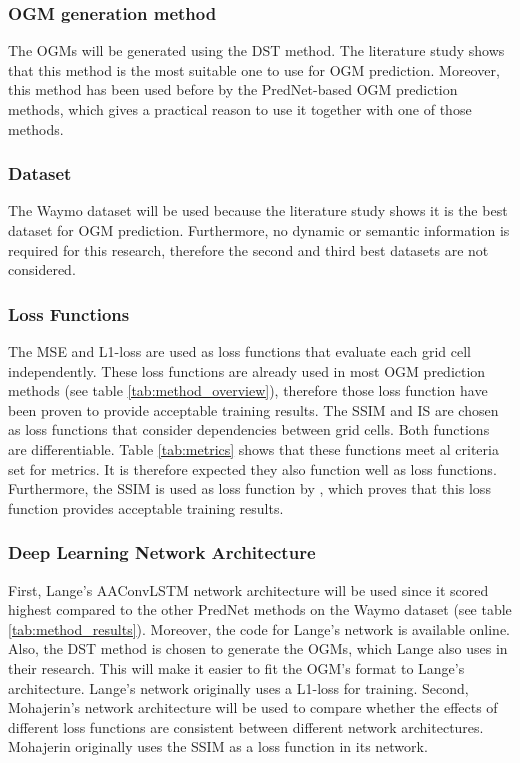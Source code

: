 \subsubsection{\gls{OGM} generation method} 
The \glspl{OGM} will be generated using the \gls{DST} method. The literature study shows that this method is the most suitable one to use for \gls{OGM} prediction. Moreover, this method has been used before by the PredNet-based \gls{OGM} prediction methods, which gives a practical reason to use it together with one of those methods.  

\subsubsection{Dataset} 
The Waymo \cite{sun2020scalability} dataset will be used because the literature study shows it is the best dataset for \gls{OGM} prediction. Furthermore, no dynamic or semantic information is required for this research, therefore the second and third best datasets are not considered. 

\subsubsection{Loss Functions}
The \gls{MSE} and L1-loss are used as loss functions that evaluate each grid cell independently. These loss functions are already used in most \gls{OGM} prediction methods (see table \ref{tab:method_overview}), therefore those loss function have been proven to provide acceptable training results. The \gls{SSIM} and \gls{IS} are chosen as loss functions that consider dependencies between grid cells. Both functions are differentiable. Table \ref{tab:metrics} shows that these functions meet al criteria set for metrics. It is therefore expected they also function well as loss functions. Furthermore, the \gls{SSIM} is used as loss function by \cite{mohajerin2019multi}, which proves that this loss function provides acceptable training results.

\subsubsection{Deep Learning Network Architecture} 
First, Lange's \cite{lange2020attention} \gls{AAConvLSTM} network architecture will be used since it scored highest compared to the other PredNet methods on the Waymo \cite{sun2020scalability} dataset (see table \ref{tab:method_results}). Moreover, the code for Lange's \cite{lange2020attention} network is available online. Also, the \gls{DST} method is chosen to generate the \glspl{OGM}, which Lange also uses in their research. This will make it easier to fit the \gls{OGM}'s format to Lange's architecture. Lange's network originally uses a L1-loss for training. 
Second, Mohajerin's \cite{mohajerin2019multi} network architecture will be used to compare whether the effects of different loss functions are consistent between different network architectures. Mohajerin \cite{mohajerin2019multi} originally uses the \gls{SSIM} as a loss function in its network.

